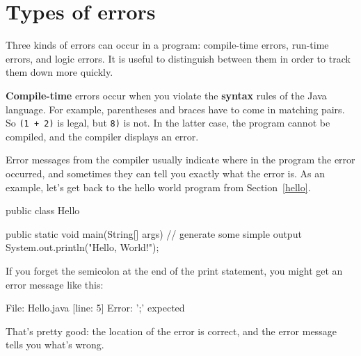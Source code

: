 \documentclass[12pt]{book}
\theoremstyle{exercise}
\newcommand{\java}[1]{\verb"#1"}
\begin{document}


\section{Types of errors}


Three kinds of errors can occur in a program: compile-time errors, run-time errors, and logic errors.
It is useful to distinguish between them in order to track them down more quickly.


{\bf Compile-time} errors occur when you violate the {\bf syntax} rules of the Java language.
For example, parentheses and braces have to come in matching pairs.
So \java{(1 + 2)} is legal, but \java{8)} is not.
In the latter case, the program cannot be compiled, and the compiler displays an error.


Error messages from the compiler usually indicate where in the program the error occurred, and sometimes they can tell you exactly what the error is.
As an example, let's get back to the hello world program from Section~\ref{hello}.

\begin{code}
public class Hello {

    public static void main(String[] args) {
        // generate some simple output
        System.out.println("Hello, World!");
    }
}
\end{code}

If you forget the semicolon at the end of the print statement, you might get an error message like this:

\begin{stdout}
File: Hello.java  [line: 5]
Error: ';' expected
\end{stdout}

That's pretty good: the location of the error is correct, and the error message tells you what's wrong.
\end{document}
